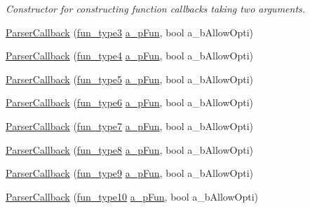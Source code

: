 \begin{DoxyCompactItemize}
\begin{DoxyCompactList}\small\item\em Constructor for constructing function callbacks taking two arguments. \end{DoxyCompactList}\item 
\hyperlink{classmu_1_1_parser_callback_a9d151844c0da252efe528b39f5f2c401}{Parser\+Callback} (\hyperlink{namespacemu_ac89cbeb049bfe0ac38464d9420bf3201}{fun\+\_\+type3} \hyperlink{mu_parser_d_l_l_8h_ab3a3ed85edf393f2b8ad69081fe538e8}{a\+\_\+p\+Fun}, bool a\+\_\+b\+Allow\+Opti)
\item 
\hyperlink{classmu_1_1_parser_callback_a349b0be9ad797a629fa1bff1141fc03e}{Parser\+Callback} (\hyperlink{namespacemu_ada318070796bde216079092cfdcf6fe1}{fun\+\_\+type4} \hyperlink{mu_parser_d_l_l_8h_ab3a3ed85edf393f2b8ad69081fe538e8}{a\+\_\+p\+Fun}, bool a\+\_\+b\+Allow\+Opti)
\item 
\hyperlink{classmu_1_1_parser_callback_aeba7f6318f9efcadd2adc9a0aa9a6b90}{Parser\+Callback} (\hyperlink{namespacemu_a7a01724f9caaf71f99e46b49e75b3bc3}{fun\+\_\+type5} \hyperlink{mu_parser_d_l_l_8h_ab3a3ed85edf393f2b8ad69081fe538e8}{a\+\_\+p\+Fun}, bool a\+\_\+b\+Allow\+Opti)
\item 
\hyperlink{classmu_1_1_parser_callback_a7aedd247c4cb3356a9273158e0705678}{Parser\+Callback} (\hyperlink{namespacemu_a575003f957a2a77d757e24fd04139001}{fun\+\_\+type6} \hyperlink{mu_parser_d_l_l_8h_ab3a3ed85edf393f2b8ad69081fe538e8}{a\+\_\+p\+Fun}, bool a\+\_\+b\+Allow\+Opti)
\item 
\hyperlink{classmu_1_1_parser_callback_a83af2994034ca224034492ceed5a6e09}{Parser\+Callback} (\hyperlink{namespacemu_aa03550a6f05b1270e1e27214a63301ee}{fun\+\_\+type7} \hyperlink{mu_parser_d_l_l_8h_ab3a3ed85edf393f2b8ad69081fe538e8}{a\+\_\+p\+Fun}, bool a\+\_\+b\+Allow\+Opti)
\item 
\hyperlink{classmu_1_1_parser_callback_ad7cb85d33f18dc907f65ffd570cf3b5b}{Parser\+Callback} (\hyperlink{namespacemu_a17cfcdc39e8d1d95c1418e117eb923b8}{fun\+\_\+type8} \hyperlink{mu_parser_d_l_l_8h_ab3a3ed85edf393f2b8ad69081fe538e8}{a\+\_\+p\+Fun}, bool a\+\_\+b\+Allow\+Opti)
\item 
\hyperlink{classmu_1_1_parser_callback_a19bf0a37fcf8cf8e5cfd72cc31551d2c}{Parser\+Callback} (\hyperlink{namespacemu_a04c92810aa2e6098af69f47474388d71}{fun\+\_\+type9} \hyperlink{mu_parser_d_l_l_8h_ab3a3ed85edf393f2b8ad69081fe538e8}{a\+\_\+p\+Fun}, bool a\+\_\+b\+Allow\+Opti)
\item 
\hyperlink{classmu_1_1_parser_callback_a407a1c4350e27aafd690b748b2b1b6cd}{Parser\+Callback} (\hyperlink{namespacemu_a9d79a17c5171e8928f8c91964979e56c}{fun\+\_\+type10} \hyperlink{mu_parser_d_l_l_8h_ab3a3ed85edf393f2b8ad69081fe538e8}{a\+\_\+p\+Fun}, bool a\+\_\+b\+Allow\+Opti)

\end{DoxyCompactItemize}
